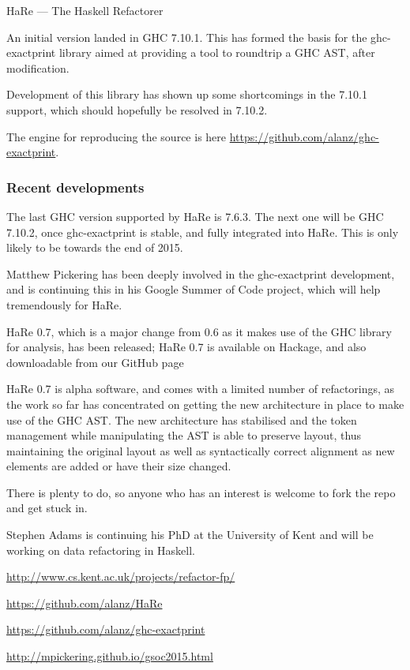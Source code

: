 \begin{hcarentry}[updated]{HaRe --- The Haskell Refactorer}
\begin{compactitem}
\end{compactitem}

An initial version landed in GHC 7.10.1. This has formed the basis for the
ghc-exactprint library aimed at providing a tool to roundtrip a GHC AST, after
modification.

Development of this library has shown up some shortcomings in the 7.10.1
support, which should hopefully be resolved in 7.10.2.

The engine for reproducing the source is here
\url{https://github.com/alanz/ghc-exactprint}.

\subsubsection*{Recent developments}
\begin{compactitem}

\item The last GHC version supported by HaRe is 7.6.3. The next one will be GHC
  7.10.2, once ghc-exactprint is stable, and fully integrated into HaRe. This is
  only likely to be towards the end of 2015.
  
\item Matthew Pickering has been deeply involved in the ghc-exactprint
  development, and is continuing this in his Google Summer of Code project,
  which will help tremendously for HaRe.

\item HaRe 0.7, which is a major change from 0.6 as it makes use of
  the GHC library for analysis, has been released; HaRe 0.7 is
  available on Hackage, and also downloadable from our GitHub page

\item HaRe 0.7 is alpha software, and comes with a limited number of
  refactorings, as the work so far has concentrated on getting the new
  architecture in place to make use of the GHC AST. The new
  architecture has stabilised and the token management while
  manipulating the AST is able to preserve layout, thus maintaining
  the original layout as well as syntactically correct alignment as
  new elements are added or have their size changed.

\item There is plenty to do, so anyone who has an interest is welcome
  to fork the repo and get stuck in.
\item Stephen Adams is continuing his PhD at the University of Kent and
  will be working on data refactoring in Haskell.
\end{compactitem}

\FurtherReading
\begin{compactitem}
\item \url{http://www.cs.kent.ac.uk/projects/refactor-fp/}
\item \url{https://github.com/alanz/HaRe}
\item \url{https://github.com/alanz/ghc-exactprint}
\item \url{ http://mpickering.github.io/gsoc2015.html}
\end{compactitem}
\end{hcarentry}
